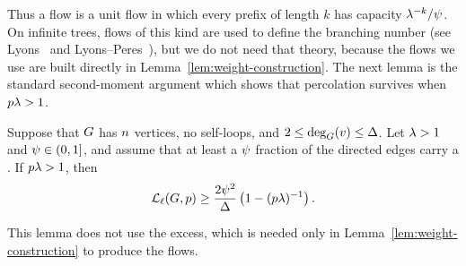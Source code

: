 Thus a flow is a unit flow in which every prefix of length \(k\) has capacity
\(\lambda^{-k}/\psi\). On infinite trees, flows of this kind are used to define
the branching number (see Lyons~\cite{Lyons1990} and
Lyons--Peres~\cite{LyonsPeres2016}), but we do not need that theory, because the
flows we use are built directly in Lemma~\ref{lem:weight-construction}. The
next lemma is the standard second-moment argument which shows that percolation
survives when \(p\lambda>1\).

\begin{lemma}
\label{lem:weighted-path-percolation}
Suppose that \(G\) has \(n\) vertices, no self-loops, and
\(2\le\deg_{G}(v)\le\Delta\). Let \(\lambda>1\) and \(\psi\in(0,1]\), and assume
that at least a \(\psi\) fraction of the directed edges carry a
\flowt{\brnum}{\gfrac}. If \(p\lambda>1\), then
\begin{equation}\label{eq:abstract-path-lower-bound}
  \mathcal{L}_{\ell}(G,p)
  \ge \frac{2\psi^2}{\Delta}\left(1-(p\lambda)^{-1}\right).
\end{equation}
\end{lemma}

This lemma does not use the excess, which is needed only in
Lemma~\ref{lem:weight-construction} to produce the flows.

